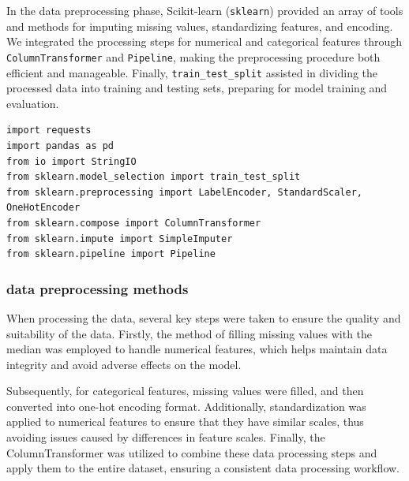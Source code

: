 \documentclass[12pt]{article}
\begin{document}
In the data preprocessing phase, Scikit-learn (\texttt{sklearn}) provided an array of tools and methods for imputing missing values, standardizing features, and encoding. We integrated the processing steps for numerical and categorical features through \texttt{ColumnTransformer} and \texttt{Pipeline}, making the preprocessing procedure both efficient and manageable. Finally, \texttt{train\_test\_split} assisted in dividing the processed data into training and testing sets, preparing for model training and evaluation.

\begin{verbatim}
import requests
import pandas as pd
from io import StringIO
from sklearn.model_selection import train_test_split
from sklearn.preprocessing import LabelEncoder, StandardScaler, OneHotEncoder
from sklearn.compose import ColumnTransformer
from sklearn.impute import SimpleImputer
from sklearn.pipeline import Pipeline
\end{verbatim}
\subsubsection*{data preprocessing methods}



When processing the data, several key steps were taken to ensure the quality and suitability of the data. Firstly, the method of filling missing values with the median was employed to handle numerical features, which helps maintain data integrity and avoid adverse effects on the model. 

Subsequently, for categorical features, missing values were filled, and then converted into one-hot encoding format. Additionally, standardization was applied to numerical features to ensure that they have similar scales, thus avoiding issues caused by differences in feature scales. Finally, the ColumnTransformer was utilized to combine these data processing steps and apply them to the entire dataset, ensuring a consistent data processing workflow.
\end{document}

